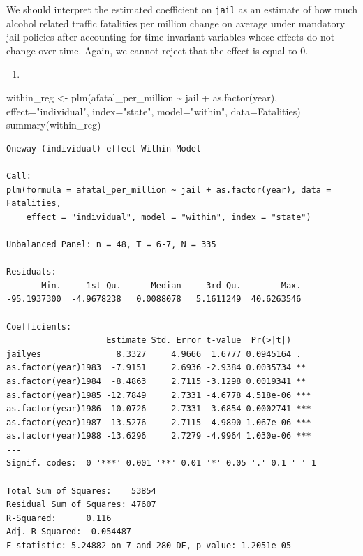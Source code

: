 \documentclass[
  letterpaper,
  DIV=11,
  numbers=noendperiod]{scrreprt}
\newenvironment{Shaded}{\begin{snugshade}}{\end{snugshade}}
\newcommand{\AttributeTok}[1]{\textcolor[rgb]{0.40,0.45,0.13}{#1}}
\newcommand{\FunctionTok}[1]{\textcolor[rgb]{0.28,0.35,0.67}{#1}}
\newcommand{\NormalTok}[1]{\textcolor[rgb]{0.00,0.23,0.31}{#1}}
\newcommand{\OtherTok}[1]{\textcolor[rgb]{0.00,0.23,0.31}{#1}}
\newcommand{\SpecialCharTok}[1]{\textcolor[rgb]{0.37,0.37,0.37}{#1}}
\newcommand{\StringTok}[1]{\textcolor[rgb]{0.13,0.47,0.30}{#1}}
\providecommand{\tightlist}{%
  \setlength{\itemsep}{0pt}\setlength{\parskip}{0pt}}\usepackage{longtable,booktabs,array}
\begin{document}
We should interpret the estimated coefficient on \texttt{jail} as an
estimate of how much alcohol related traffic fatalities per million
change on average under mandatory jail policies after accounting for
time invariant variables whose effects do not change over time. Again,
we cannot reject that the effect is equal to 0.

\begin{enumerate}
\def\labelenumi{\arabic{enumi}.}
\setcounter{enumi}{4}
\tightlist
\item
\end{enumerate}

\begin{Shaded}
\begin{Highlighting}[]
\NormalTok{within\_reg }\OtherTok{\textless{}{-}} \FunctionTok{plm}\NormalTok{(afatal\_per\_million }\SpecialCharTok{\textasciitilde{}}\NormalTok{ jail }\SpecialCharTok{+} \FunctionTok{as.factor}\NormalTok{(year),}
              \AttributeTok{effect=}\StringTok{"individual"}\NormalTok{,}
              \AttributeTok{index=}\StringTok{"state"}\NormalTok{, }\AttributeTok{model=}\StringTok{"within"}\NormalTok{,}
              \AttributeTok{data=}\NormalTok{Fatalities)}
\FunctionTok{summary}\NormalTok{(within\_reg)}
\end{Highlighting}
\end{Shaded}

\begin{verbatim}
Oneway (individual) effect Within Model

Call:
plm(formula = afatal_per_million ~ jail + as.factor(year), data = Fatalities, 
    effect = "individual", model = "within", index = "state")

Unbalanced Panel: n = 48, T = 6-7, N = 335

Residuals:
       Min.     1st Qu.      Median     3rd Qu.        Max. 
-95.1937300  -4.9678238   0.0088078   5.1611249  40.6263546 

Coefficients:
                    Estimate Std. Error t-value  Pr(>|t|)    
jailyes               8.3327     4.9666  1.6777 0.0945164 .  
as.factor(year)1983  -7.9151     2.6936 -2.9384 0.0035734 ** 
as.factor(year)1984  -8.4863     2.7115 -3.1298 0.0019341 ** 
as.factor(year)1985 -12.7849     2.7331 -4.6778 4.518e-06 ***
as.factor(year)1986 -10.0726     2.7331 -3.6854 0.0002741 ***
as.factor(year)1987 -13.5276     2.7115 -4.9890 1.067e-06 ***
as.factor(year)1988 -13.6296     2.7279 -4.9964 1.030e-06 ***
---
Signif. codes:  0 '***' 0.001 '**' 0.01 '*' 0.05 '.' 0.1 ' ' 1

Total Sum of Squares:    53854
Residual Sum of Squares: 47607
R-Squared:      0.116
Adj. R-Squared: -0.054487
F-statistic: 5.24882 on 7 and 280 DF, p-value: 1.2051e-05
\end{verbatim}
\end{document}
